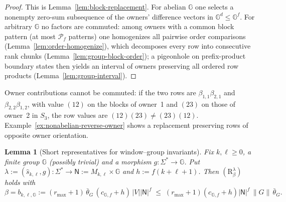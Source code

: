\documentclass[11pt]{article}
\numberwithin{equation}{section}
\theoremstyle{plain}
\newtheorem{lemma}[theorem]{Lemma}
\theoremstyle{definition}
\theoremstyle{remark}
\begin{document}
\begin{proof}
This is Lemma~\ref{lem:block-replacement}.  For abelian ${\mathbb G}$ one selects a
nonempty zero-sum subsequence of the owners' difference vectors in
${\mathbb G}^d\le {\mathbb G}^f$.  For arbitrary ${\mathbb G}$ no factors are commuted: among owners with a
common block pattern (at most $\mathcal P_f$ patterns) one homogenizes all pairwise order
comparisons (Lemma~\ref{lem:order-homogenize}), which decomposes every row into
consecutive rank chunks (Lemma~\ref{lem:group-block-order}); a pigeonhole on
prefix-product boundary states then yields an interval of owners preserving all
ordered row products (Lemma~\ref{lem:group-interval}).
\end{proof}

Owner contributions cannot be commuted: if the two rows are
$\beta_{1,1}\beta_{2,1}$ and $\beta_{2,2}\beta_{1,2}$, with value $(12)$ on the
blocks of owner~1 and $(23)$ on those of owner~2 in $S_3$, the row values are
$(12)(23)\ne(23)(12)$.
Example~\ref{ex:nonabelian-reverse-owner} shows a replacement preserving rows of
opposite owner orientation.

\begin{lemma}[Short representatives for window--group invariants]
\label{lem:marked-heavy-window-group}
Fix $k,\ell\ge0$, a finite group ${\mathbb G}$ (possibly trivial) and a morphism
$g:\Sigma^*\to {\mathbb G}$.  Put $\lambda:=(\widehat s_{k,\ell},g):\Sigma^*\to
\mathsf N:=M_{k,\ell}\times {\mathbb G}$ and $h:=f(k+\ell+1)$.  Then $(\mathrm R_\beta^\lambda)$ holds with
\[
 \beta=b_{k,\ell,{\mathbb G}}:=(r_{\max}+1)\,\bar\theta_G\,(c_{{\mathbb G},f}+h)\,|V||\mathsf N|^f
 \;\le\;(r_{\max}+1)(c_{{\mathbb G},f}+h)|\mathsf N|^f\,\|G\|\,\bar\theta_G .
\]
\end{lemma}
\end{document}

